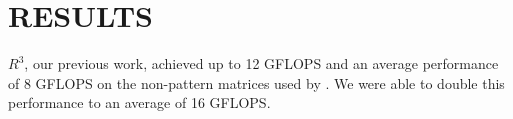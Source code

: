 \chapter{RESULTS}
\label{chp:results}
$R^3$, our previous work, achieved up to 12 GFLOPS and an average performance of 8 GFLOPS on the non-pattern matrices used by \cite{prelim:bell}. We were able to double this performance to an average of 16 GFLOPS.

